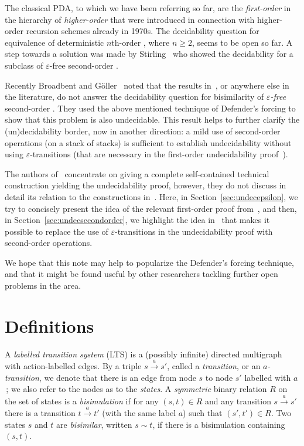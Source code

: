 \documentclass[11pt]{article}
\newcommand{\pda}{\text{PDA}\xspace}
\newcommand{\dpda}{\text{DPDA}\xspace}
\newcommand{\goes}[1]{\ensuremath{\stackrel{#1}{\longrightarrow}}}
\begin{document}
The classical PDA, to which we have been referring so far, are
the \emph{first-order} \pda in the hierarchy of 
\emph{higher-order} \pda that were introduced 
in connection with higher-order recursion
schemes already in 1970s.
The decidability question for equivalence of deterministic
$n$th-order \pda,
where $n\geq 2$,
seems to be open so far. A step towards a solution was made by
Stirling~\cite{DBLP:conf/concur/Stirling06} who 
showed
the decidability for a subclass of 
$\varepsilon$-free
second-order \dpda.




Recently 
Broadbent and G{\"o}ller~\cite{DBLP:conf/fsttcs/BroadbentG12} 
noted that the results in~\cite{DBLP:journals/jacm/JancarS08}, or
anywhere else in the literature, do not answer the decidability question for
bisimilarity of \emph{$\varepsilon$-free} second-order \pda.
They used the above mentioned technique of Defender's
forcing to show that this problem is also undecidable.
This result helps to further 
clarify the (un)decidability border, now in another
direction:
a mild use of second-order operations 
(on a stack of stacks)
is sufficient 
to establish undecidability without using
$\varepsilon$-transitions (that are necessary in the first-order
undecidability proof~\cite{DBLP:journals/jacm/JancarS08}).


The authors of~\cite{DBLP:conf/fsttcs/BroadbentG12} concentrate on
giving a complete self-contained technical construction yielding the
undecidability proof, however, they do not discuss in detail its relation to the
constructions in~\cite{DBLP:journals/jacm/JancarS08}. 
Here, in Section~\ref{sec:undecepsilon},
we try to concisely  present the idea of the relevant first-order proof 
from~\cite{DBLP:journals/jacm/JancarS08}, 
and then, in Section~\ref{sec:undecsecondorder}, we highlight the
idea in~\cite{DBLP:conf/fsttcs/BroadbentG12} that makes it 
possible to replace
the use of $\varepsilon$-transitions 
in the undecidability proof
with second-order operations.


We hope that this note may help to popularize 
the Defender's forcing technique,
and that it might be found useful by other researchers
tackling further open problems in the area. 


\section{Definitions}\label{sec:definitions}

A \emph{labelled transition system} (LTS) is a 
(possibly infinite) directed multigraph with action-labelled
edges. By a triple $s\goes{a}s'$, called a \emph{transition}, 
or an \emph{$a$-transition},
we denote
that there is 
an edge from node $s$ to node $s'$ labelled with $a$\,;
we also refer to the nodes as
to the \emph{states}.
A \emph{symmetric} binary relation $R$ on the set of states
is a \emph{bisimulation} if for any $(s,t) \in R$ and any 
transition $s \goes{a} s'$ there is a transition $t \goes{a} t'$ 
(with the same label $a$)
such that $(s',t') \in R$. Two states $s$ and $t$ are
\emph{bisimilar}, written $s \sim t$, if there is a bisimulation
containing $(s,t)$.
\end{document}

